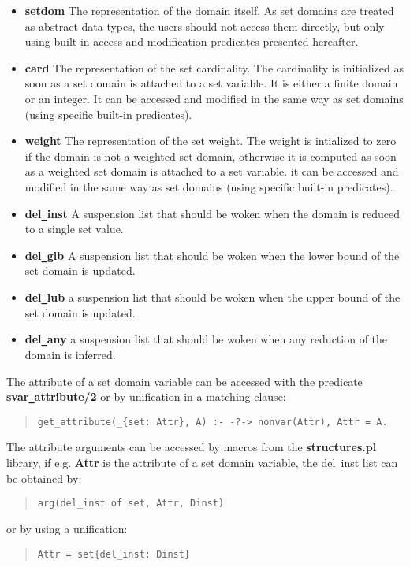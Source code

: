 \begin{itemize}
\item {\bf setdom} The representation of the domain itself. As set
domains are treated as abstract data types, the users should not
access them directly, but only using built-in access and modification
predicates presented hereafter.
\item {\bf card} The representation of the set cardinality. The
cardinality is initialized as soon as a set domain is attached to
a set variable. It is either a finite domain or an integer. It can
be accessed and modified in the same way as set domains (using
specific built-in predicates).
\item {\bf weight} The representation of the set weight. The weight is
intialized to zero if the domain is not a weighted set domain, otherwise it
is computed as soon as a weighted set domain is attached to a set
variable. it can be accessed and modified in the same way as set
domains (using specific built-in predicates).
\item {\bf del\verb/_/inst} A suspension list that should be woken
when the domain is reduced to a single set value.
\item {\bf del\verb/_/glb} A suspension list that should be woken when
the lower bound of the set domain is updated.
\item {\bf del\verb/_/lub} a suspension list that should be woken when
the upper bound of the set domain is updated.
\item {\bf del\verb/_/any} a suspension list that should be woken when
any reduction of the domain is inferred.
\end{itemize}

\noindent
The attribute of a set domain variable can be accessed with the
predicate {\bf svar\verb/_/attribute/2} or by unification
in a matching clause:
\begin{quote}\begin{verbatim}
get_attribute(_{set: Attr}, A) :- -?-> nonvar(Attr), Attr = A.
\end{verbatim}\end{quote}
The attribute arguments can be accessed by macros from the \eclipse
{\bf structures.pl} library, if e.g. {\bf Attr} is the attribute of a
set domain variable, the del\verb/_/inst list can be obtained by:
\begin{quote}\begin{verbatim}
arg(del_inst of set, Attr, Dinst)
\end{verbatim}\end{quote}
or by using a unification: 
\begin{quote}\begin{verbatim}
Attr = set{del_inst: Dinst}
\end{verbatim}\end{quote}

